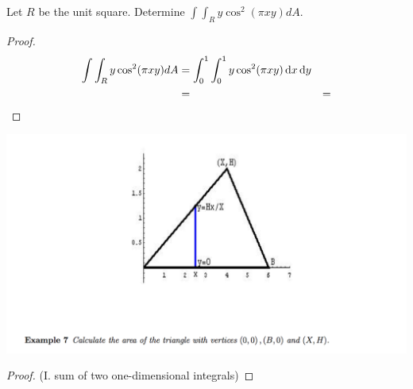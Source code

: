 \begin{example*}[6]
  Let $R$ be the unit square. Determine $\int\int_R y\cos^2(\pi xy) dA$.
\end{example*}


\begin{proof}
  \begin{align*}
    \int\int_R y\cos^2(\pi xy) dA
    &= \int_0^1\int_0^1 y\cos^2(\pi xy) \dx\dy\\
    &=
    &=
  \end{align*}
\end{proof}

\begin{mdframed}
  \includegraphics[width=400pt]{img/oxford-prelims-M5-multivariable-calc-ex-7.png}
\end{mdframed}


\begin{proof}(I. sum of two one-dimensional integrals)
\end{proof}

